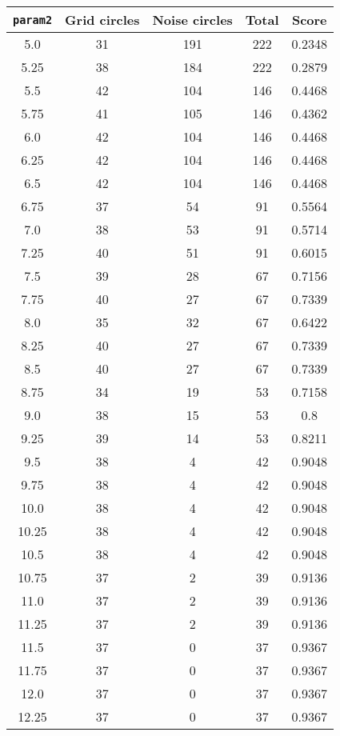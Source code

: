 \documentclass[letterpaper, 12pt]{article}
\begin{document}
\begin{longtable}{|c|c|c|c|c|}
\hline
\textbf{\texttt{param2}} & \textbf{Grid circles} & \textbf{Noise circles} & \textbf{Total} & \textbf{Score} \\
\hline
5.0 & 31 & 191 & 222 & 0.2348 \\
\hline
5.25 & 38 & 184 & 222 & 0.2879 \\
\hline
5.5 & 42 & 104 & 146 & 0.4468 \\
\hline
5.75 & 41 & 105 & 146 & 0.4362 \\
\hline
6.0 & 42 & 104 & 146 & 0.4468 \\
\hline
6.25 & 42 & 104 & 146 & 0.4468 \\
\hline
6.5 & 42 & 104 & 146 & 0.4468 \\
\hline
6.75 & 37 & 54 & 91 & 0.5564 \\
\hline
7.0 & 38 & 53 & 91 & 0.5714 \\
\hline
7.25 & 40 & 51 & 91 & 0.6015 \\
\hline
7.5 & 39 & 28 & 67 & 0.7156 \\
\hline
7.75 & 40 & 27 & 67 & 0.7339 \\
\hline
8.0 & 35 & 32 & 67 & 0.6422 \\
\hline
8.25 & 40 & 27 & 67 & 0.7339 \\
\hline
8.5 & 40 & 27 & 67 & 0.7339 \\
\hline
8.75 & 34 & 19 & 53 & 0.7158 \\
\hline
9.0 & 38 & 15 & 53 & 0.8 \\
\hline
9.25 & 39 & 14 & 53 & 0.8211 \\
\hline
9.5 & 38 & 4 & 42 & 0.9048 \\
\hline
9.75 & 38 & 4 & 42 & 0.9048 \\
\hline
10.0 & 38 & 4 & 42 & 0.9048 \\
\hline
10.25 & 38 & 4 & 42 & 0.9048 \\
\hline
10.5 & 38 & 4 & 42 & 0.9048 \\
\hline
10.75 & 37 & 2 & 39 & 0.9136 \\
\hline
11.0 & 37 & 2 & 39 & 0.9136 \\
\hline
11.25 & 37 & 2 & 39 & 0.9136 \\
\hline
11.5 & 37 & 0 & 37 & 0.9367 \\
\hline
11.75 & 37 & 0 & 37 & 0.9367 \\
\hline
12.0 & 37 & 0 & 37 & 0.9367 \\
\hline
12.25 & 37 & 0 & 37 & 0.9367 \\
\hline

\end{longtable}
\end{document}
